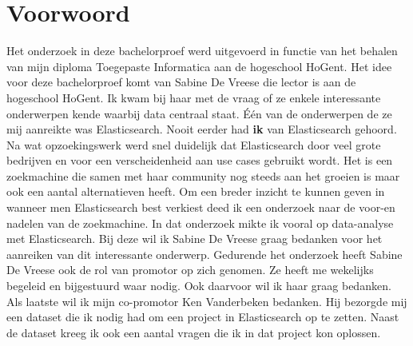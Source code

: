 
\chapter{Voorwoord}
\label{ch:voorwoord}


Het onderzoek in deze bachelorproef werd uitgevoerd in functie van het behalen van mijn diploma Toegepaste Informatica aan de hogeschool HoGent. Het idee voor deze bachelorproef komt van Sabine De Vreese die lector is aan de hogeschool HoGent. Ik kwam bij haar met de vraag of ze enkele interessante onderwerpen kende waarbij data centraal staat. Één van de onderwerpen de ze mij aanreikte was Elasticsearch. Nooit eerder had \textbf{ik} van Elasticsearch gehoord. Na wat opzoekingswerk werd snel duidelijk dat Elasticsearch door veel grote bedrijven en voor een verscheidenheid aan use cases gebruikt wordt. Het is een zoekmachine die samen met haar community nog steeds aan het groeien is maar ook een aantal alternatieven heeft. Om een breder inzicht te kunnen geven in wanneer men Elasticsearch best verkiest deed ik een onderzoek naar de voor-en nadelen van de zoekmachine. In dat onderzoek mikte ik vooral op data-analyse met Elasticsearch. Bij deze wil ik Sabine De Vreese graag bedanken voor het aanreiken van dit interessante onderwerp. Gedurende het onderzoek heeft Sabine De Vreese ook de rol van promotor op zich genomen. Ze heeft me wekelijks begeleid en bijgestuurd waar nodig. Ook daarvoor wil ik haar graag bedanken. Als laatste wil ik mijn co-promotor Ken Vanderbeken bedanken. Hij bezorgde mij een dataset die ik nodig had om een project in Elasticsearch op te zetten. Naast de dataset kreeg ik ook een aantal vragen die ik in dat project kon oplossen.

